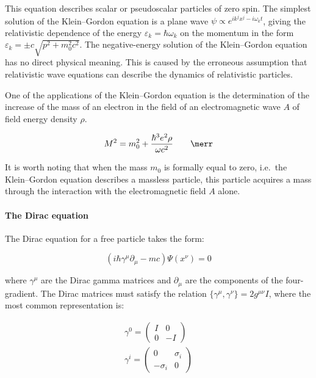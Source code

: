 This equation describes scalar or pseudoscalar particles of zero spin. The simplest solution of the Klein--Gordon equation is a plane wave $\psi \propto e^{ik^jx^j - i\omega_k t}$, giving the relativistic dependence of the energy $\varepsilon_k = \hbar\omega_k$ on the momentum in the form $\varepsilon_k = \pm c\sqrt{p^2 + m_0^2c^2}$. The negative-energy solution of the Klein--Gordon equation has no direct physical meaning. This is caused by the erroneous assumption that relativistic wave equations can describe the dynamics of relativistic particles.

One of the applications of the Klein--Gordon equation is the determination of the increase of the mass of an electron in the field of an electromagnetic wave $A$ of field energy density $\rho$.

\begin{equation}
    M^2 = m_0^2 + \frac{\hbar^3e^2\rho}{\omega c^2} \qquad \merr
\end{equation}

It is worth noting that when the mass $m_0$ is formally equal to zero, i.e.\ the Klein--Gordon equation describes a massless particle, this particle acquires a mass through the interaction with the electromagnetic field $A$ alone.

\paragraph{The Dirac equation}

The Dirac equation for a free particle takes the form:

\begin{equation}
(i\hbar \gamma^{\mu}\partial_{\mu} - mc)\Psi(x^{\nu}) = 0
\end{equation}

where $\gamma^{\mu}$ are the Dirac gamma matrices and $\partial_{\mu}$ are the components of the four-gradient. The Dirac matrices must satisfy the relation $\{\gamma^{\mu},\gamma^{\nu}\} = 2g^{\mu \nu }I$, where the most common representation is: %

\begin{align}
    \gamma^0 =
    \begin{pmatrix}
        I & 0\\
        0 & -I
    \end{pmatrix}\\
    \gamma^i =
    \begin{pmatrix}
        0 & \sigma_i\\
        -\sigma_i & 0
    \end{pmatrix}
\end{align}

